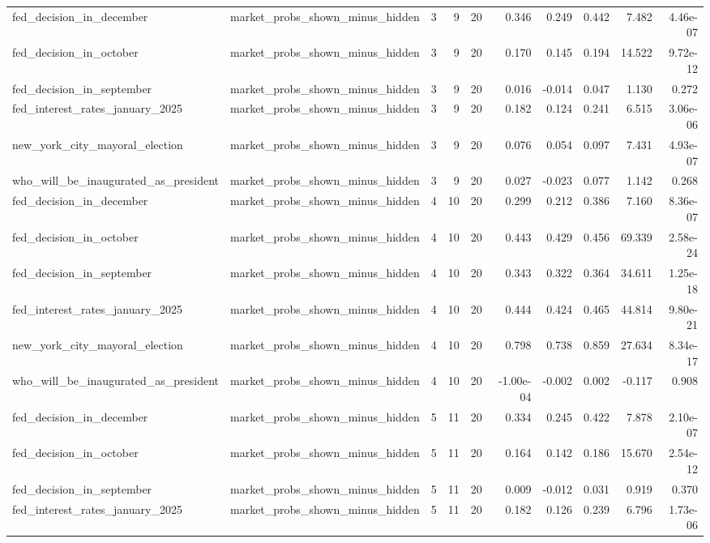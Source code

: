 \begin{longtable}{llrrrrrrrr}
fed\_decision\_in\_december & market\_probs\_shown\_minus\_hidden & 3 & 9 & 20 & 0.346 & 0.249 & 0.442 & 7.482 & 4.46e-07 \\
fed\_decision\_in\_october & market\_probs\_shown\_minus\_hidden & 3 & 9 & 20 & 0.170 & 0.145 & 0.194 & 14.522 & 9.72e-12 \\
fed\_decision\_in\_september & market\_probs\_shown\_minus\_hidden & 3 & 9 & 20 & 0.016 & -0.014 & 0.047 & 1.130 & 0.272 \\
fed\_interest\_rates\_january\_2025 & market\_probs\_shown\_minus\_hidden & 3 & 9 & 20 & 0.182 & 0.124 & 0.241 & 6.515 & 3.06e-06 \\
new\_york\_city\_mayoral\_election & market\_probs\_shown\_minus\_hidden & 3 & 9 & 20 & 0.076 & 0.054 & 0.097 & 7.431 & 4.93e-07 \\
who\_will\_be\_inaugurated\_as\_president & market\_probs\_shown\_minus\_hidden & 3 & 9 & 20 & 0.027 & -0.023 & 0.077 & 1.142 & 0.268 \\
fed\_decision\_in\_december & market\_probs\_shown\_minus\_hidden & 4 & 10 & 20 & 0.299 & 0.212 & 0.386 & 7.160 & 8.36e-07 \\
fed\_decision\_in\_october & market\_probs\_shown\_minus\_hidden & 4 & 10 & 20 & 0.443 & 0.429 & 0.456 & 69.339 & 2.58e-24 \\
fed\_decision\_in\_september & market\_probs\_shown\_minus\_hidden & 4 & 10 & 20 & 0.343 & 0.322 & 0.364 & 34.611 & 1.25e-18 \\
fed\_interest\_rates\_january\_2025 & market\_probs\_shown\_minus\_hidden & 4 & 10 & 20 & 0.444 & 0.424 & 0.465 & 44.814 & 9.80e-21 \\
new\_york\_city\_mayoral\_election & market\_probs\_shown\_minus\_hidden & 4 & 10 & 20 & 0.798 & 0.738 & 0.859 & 27.634 & 8.34e-17 \\
who\_will\_be\_inaugurated\_as\_president & market\_probs\_shown\_minus\_hidden & 4 & 10 & 20 & -1.00e-04 & -0.002 & 0.002 & -0.117 & 0.908 \\
fed\_decision\_in\_december & market\_probs\_shown\_minus\_hidden & 5 & 11 & 20 & 0.334 & 0.245 & 0.422 & 7.878 & 2.10e-07 \\
fed\_decision\_in\_october & market\_probs\_shown\_minus\_hidden & 5 & 11 & 20 & 0.164 & 0.142 & 0.186 & 15.670 & 2.54e-12 \\
fed\_decision\_in\_september & market\_probs\_shown\_minus\_hidden & 5 & 11 & 20 & 0.009 & -0.012 & 0.031 & 0.919 & 0.370 \\
fed\_interest\_rates\_january\_2025 & market\_probs\_shown\_minus\_hidden & 5 & 11 & 20 & 0.182 & 0.126 & 0.239 & 6.796 & 1.73e-06 \\

\end{longtable}
